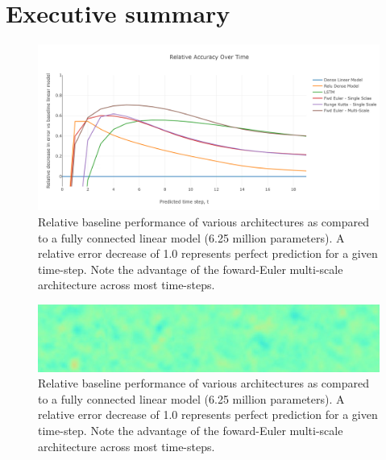 \documentclass[12pt]{article}
\theoremstyle{plain}
\theoremstyle{remark}
\theoremstyle{definition}
\begin{document}


\section{Executive summary}

\begin{figure}
	\centering
	\includegraphics[width=0.95\linewidth]{image_preview}
	\caption{\small Relative baseline performance of various architectures as compared to a fully connected linear model (6.25 million parameters). A relative error decrease of 1.0 represents perfect prediction for a given time-step. Note the advantage of the foward-Euler multi-scale architecture across most time-steps.}
	\label{fig:pdeperf}
\end{figure}	

\begin{figure}
	\centering
	\includegraphics[width=0.95\linewidth]{high_frequency_noise}
	\caption{\small Relative baseline performance of various architectures as compared to a fully connected linear model (6.25 million parameters). A relative error decrease of 1.0 represents perfect prediction for a given time-step. Note the advantage of the foward-Euler multi-scale architecture across most time-steps.}
	\label{fig:pdeperf}
\end{figure}	
\end{document}
